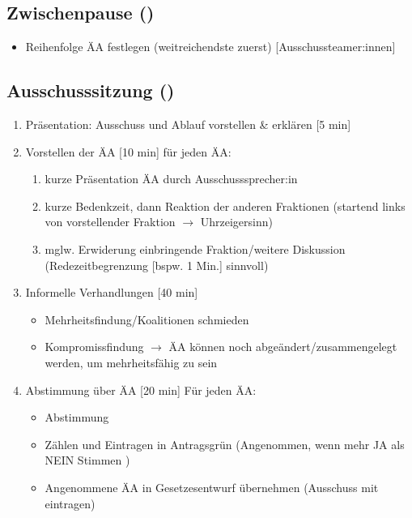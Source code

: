 \documentclass{article}
\begin{document}
	\subsection{Zwischenpause (\timePauseOne)}
	\begin{itemize}
		\item Reihenfolge ÄA festlegen (weitreichendste zuerst) [Ausschussteamer:innen]
	\end{itemize}
	
	\subsection{Ausschusssitzung (\timeAuss)}
	\begin{enumerate}
		\item Präsentation: Ausschuss und Ablauf vorstellen \& erklären [5 min]
        \item Vorstellen der ÄA [10 min] \newline
        für jeden ÄA:
        \begin{enumerate}
            \item kurze Präsentation ÄA durch Ausschusssprecher:in
			\item kurze Bedenkzeit, dann Reaktion der anderen Fraktionen (startend links von vorstellender Fraktion $\to$ Uhrzeigersinn)
            \item mglw. Erwiderung einbringende Fraktion/weitere Diskussion \newline (Redezeitbegrenzung [bspw. 1 Min.] sinnvoll)
        \end{enumerate}
		\item Informelle Verhandlungen [40 min]
		\begin{itemize}
			\item Mehrheitsfindung/Koalitionen schmieden
			\item Kompromissfindung $\to$ ÄA können noch abgeändert/zusammengelegt werden, um mehrheitsfähig zu sein
		\end{itemize}
		\item Abstimmung über ÄA [20 min]\newline
		Für jeden ÄA:
		\begin{itemize}
			\item Abstimmung
			\item Zählen und Eintragen in Antragsgrün \newline
            (Angenommen, wenn mehr JA als NEIN Stimmen )
            \item Angenommene ÄA in Gesetzesentwurf übernehmen (Ausschuss mit eintragen)
		\end{itemize}
	\end{enumerate}
	
\end{document}
